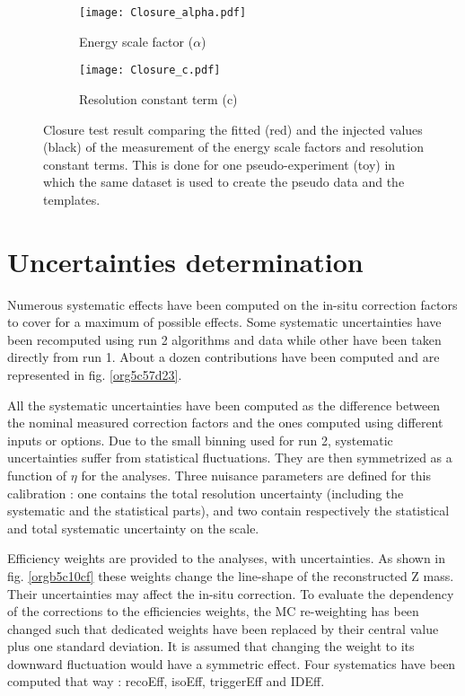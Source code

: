 \begin{figure}
\begin{subfigure}[t]{0.49\linewidth}
\begin{center}
\texttt{[image: Closure\_alpha.pdf]}
\end{center}
\caption{Energy scale factor ($\alpha$)}
\end{subfigure}
\begin{subfigure}[t]{0.49\linewidth}
\begin{center}
\texttt{[image: Closure\_c.pdf]}
\end{center}
\caption{Resolution constant term (c)}
\end{subfigure}
\caption{\label{org3e85744}
Closure test result comparing the fitted (red) and the injected values (black) of the measurement of the energy scale factors and resolution constant terms. This is done for one pseudo-experiment (toy) in which the same dataset is used to create the pseudo data and the templates.}
\end{figure}


\section{Uncertainties determination}
\label{sec:org2bc2b1f}
\label{sec:Calibration_inSituUncertainties}

Numerous systematic effects have been computed on the in-situ correction factors to cover for a maximum of possible effects.
Some systematic uncertainties have been recomputed using run 2 algorithms and data while other have been taken directly from run 1.
About a dozen contributions have been computed and are represented in fig. \ref{org5c57d23}.

All the systematic uncertainties have been computed as the difference between the nominal measured correction factors and the ones computed using different inputs or options.
Due to the small binning used for run 2, systematic uncertainties suffer from statistical fluctuations.
They are then symmetrized as a function of $\eta$ for the analyses.
Three nuisance parameters are defined for this calibration : one contains the total resolution uncertainty (including the systematic and the statistical parts), and two contain respectively the statistical and total systematic uncertainty on the scale.

Efficiency weights are provided to the analyses, with uncertainties.
As shown in fig. \ref{orgb5c10cf} these weights change the line-shape of the reconstructed Z mass.
Their uncertainties may affect the in-situ correction.
To evaluate the dependency of the corrections to the efficiencies weights, the MC re-weighting has been changed such that dedicated weights have been replaced by their central value plus one standard deviation.
It is assumed that changing the weight to its downward fluctuation would have a symmetric effect.
Four systematics have been computed that way : recoEff, isoEff, triggerEff and IDEff.

